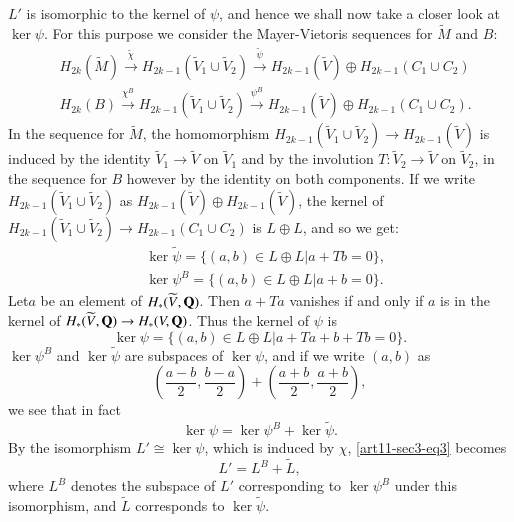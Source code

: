 $L'$ is isomorphic to the kernel of $\psi$, and hence we shall now take a closer look at $\ker \psi$. For this purpose we consider the Mayer-Vietoris sequences for $\widetilde{M}$ and $B$:
\begin{align*}
& H_{2k}(\widetilde{M})\xrightarrow{\widetilde{\chi}}H_{2k-1}(\widetilde{V}_{1}\cup \widetilde{V}_{2})\xrightarrow{\widetilde{\psi}}H_{2k-1}(\widetilde{V})\oplus H_{2k-1}(C_{1}\cup C_{2})\\[4pt]
& H_{2k}(B)\xrightarrow{\chi^{B}}H_{2k-1}(\widetilde{V}_{1}\cup \widetilde{V}_{2})\xrightarrow{\psi^{B}}H_{2k-1}(\widetilde{V})\oplus H_{2k-1}(C_{1}\cup C_{2}).
\end{align*}
In the sequence for $\widetilde{M}$, the homomorphism $H_{2k-1}(\widetilde{V}_{1}\cup \widetilde{V}_{2})\to H_{2k-1}(\widetilde{V})$ is induced by the identity $\widetilde{V}_{1}\to \widetilde{V}$ on $\widetilde{V}_{1}$ and by the involution $T:\widetilde{V}_{2}\to \widetilde{V}$ on $\widetilde{V}_{2}$, in the sequence for $B$ however by the identity on both components. If we write $H_{2k-1}(\widetilde{V}_{1}\cup \widetilde{V}_{2})$ as $H_{2k-1}(\widetilde{V})\oplus H_{2k-1}(\widetilde{V})$, the kernel of $H_{2k-1}(\widetilde{V}_{1}\cup \widetilde{V}_{2})\to H_{2k-1}(C_{1}\cup C_{2})$ is $L\oplus L$, and so we get:
\begin{align*}
&\ker \widetilde{\psi}=\{(a,b)\in L\oplus L | a+Tb=0\},\\
&\ker \psi^{B}=\{(a,b)\in L\oplus L | a+b=0\}.
\end{align*}
Let\pageoriginale $a$ be an element of $H_{*}(\widetilde{V},\mathbf{Q})$. Then $a+Ta$ vanishes if and only if $a$ is in the kernel of $H_{*}(\widetilde{V},\mathbf{Q})\to H_{*}(V,\mathbf{Q})$. Thus the kernel of $\psi$ is
$$
\ker \psi=\{(a,b)\in L\oplus L |a+Ta+b+Tb=0\}.
$$
$\ker \psi^{B}$ and $\ker \widetilde{\psi}$ are subspaces of $\ker \psi$, and if we write $(a,b)$ as 
$$
\left(\dfrac{a-b}{2},\dfrac{b-a}{2}\right)+\left(\dfrac{a+b}{2},\dfrac{a+b}{2}\right),
$$ 
we see that in fact
\begin{equation*}
\ker \psi = \ker \psi^{B}+\ker \widetilde{\psi}.\tag{3}\label{art11-sec3-eq3}
\end{equation*}
By the isomorphism $L'\cong \ker \psi$, which is induced by $\chi$, \eqref{art11-sec3-eq3} becomes
$$
L'=L^{B}+\widetilde{L},
$$
where $L^{B}$ denotes the subspace of $L'$ corresponding to $\ker \psi^{B}$ under this isomorphism, and $\widetilde{L}$ corresponds to $\ker \widetilde{\psi}$.

